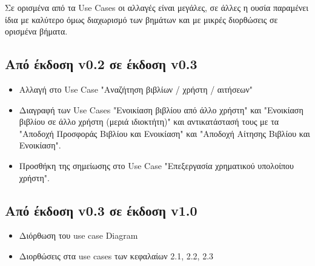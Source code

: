 \documentclass[12pt,a4paper]{article}
\begin{document}
Σε ορισμένα από τα Use Cases οι αλλαγές είναι μεγάλες, σε άλλες η ουσία παραμένει ίδια με καλύτερο όμως διαχωρισμό των βημάτων και με μικρές διορθώσεις σε ορισμένα βήματα.

\subsection{Από έκδοση v0.2 σε έκδοση v0.3}
\begin{itemize}
    \item Αλλαγή στο Use Case "Αναζήτηση βιβλίων / χρήστη / αιτήσεων"
    \item Διαγραφή των Use Cases "Ενοικίαση βιβλίου από άλλο χρήστη" και "Ενοικίαση βιβλίου σε άλλο χρήστη (μεριά ιδιοκτήτη)" και αντικατάστασή τους με τα "Αποδοχή Προσφοράς Βιβλίου και Ενοικίαση" και "Αποδοχή Αίτησης Βιβλίου και Ενοικίαση".
    \item Προσθήκη της σημείωσης στο Use Case "Επεξεργασία χρηματικού υπολοίπου χρήστη".
\end{itemize}

\subsection{Από έκδοση v0.3 σε έκδοση v1.0}
\begin{itemize}
    \item Διόρθωση του use case Diagram
    \item Διορθώσεις στα use cases των κεφαλαίων 2.1, 2.2, 2.3
\end{itemize}
\end{document}
